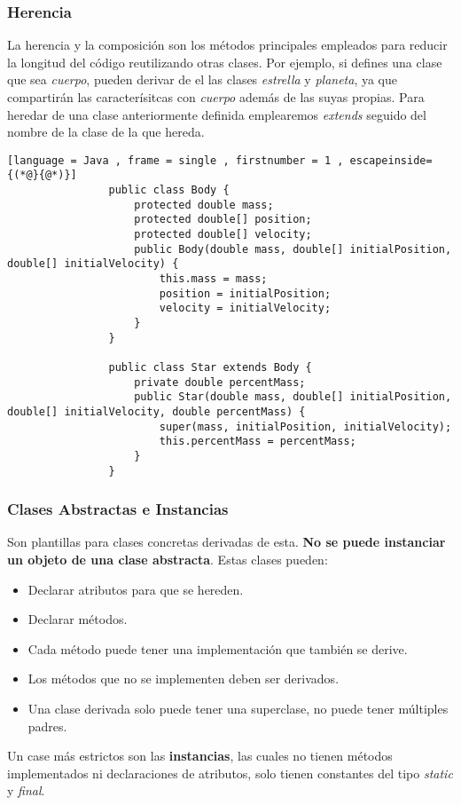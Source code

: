 \documentclass[11pt]{article}
\theoremstyle{plain}
\begin{document}
        \subsubsection{Herencia} %
        \label{subsub:herencia}
            La herencia y la composición son los métodos principales empleados para reducir la longitud del código reutilizando otras clases. Por ejemplo, si defines una clase que sea \textit{cuerpo}, pueden derivar de el las clases \textit{estrella} y \textit{planeta}, ya que compartirán las caracterísitcas con \textit{cuerpo} además de las suyas propias. Para heredar de una clase anteriormente definida emplearemos \textit{extends} seguido del nombre de la clase de la que hereda.
            \begin{lstlisting}[language = Java , frame = single , firstnumber = 1 , escapeinside={(*@}{@*)}]
                public class Body {
                    protected double mass;
                    protected double[] position;
                    protected double[] velocity;
                    public Body(double mass, double[] initialPosition, double[] initialVelocity) {
                        this.mass = mass;
                        position = initialPosition;
                        velocity = initialVelocity;
                    }
                }

                public class Star extends Body {
                    private double percentMass;
                    public Star(double mass, double[] initialPosition, double[] initialVelocity, double percentMass) {
                        super(mass, initialPosition, initialVelocity);
                        this.percentMass = percentMass;
                    }
                }
            \end{lstlisting}
        \subsubsection{Clases Abstractas e Instancias} %
        \label{subsub:clases_abstractas_e_instancias}
            Son plantillas para clases concretas derivadas de esta. \textbf{No se puede instanciar un objeto de una clase abstracta}. Estas clases pueden:
            \begin{itemize}
                \item Declarar atributos para que se hereden.
                \item Declarar métodos.
                \item Cada método puede tener una implementación que también se derive.
                \item Los métodos que no se implementen deben ser derivados.
                \item Una clase derivada solo puede tener una superclase, no puede tener múltiples padres.
            \end{itemize}
            Un case más estrictos son las \textbf{instancias}, las cuales no tienen métodos implementados ni declaraciones de atributos, solo tienen constantes del tipo \textit{static} y \textit{final}.
\end{document}
